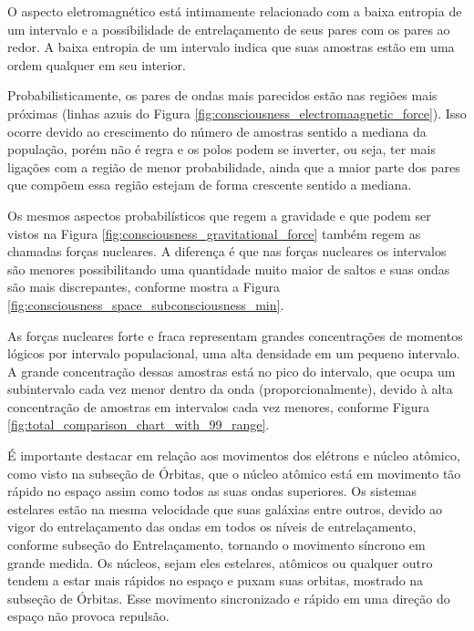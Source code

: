O aspecto eletromagnético está intimamente relacionado com a baixa entropia de um intervalo e a possibilidade de entrelaçamento de seus pares com os pares ao redor. A baixa entropia de um intervalo indica que suas amostras estão em uma ordem qualquer em seu interior.

Probabilisticamente, os pares de ondas mais parecidos estão nas regiões mais próximas (linhas azuis do Figura \ref{fig:consciousness_electromaagnetic_force}). Isso ocorre devido ao crescimento do número de amostras sentido a mediana da população, porém não é regra e os polos podem se inverter, ou seja, ter mais ligações com a região de menor probabilidade, ainda que a maior parte dos pares que compõem essa região estejam de forma crescente sentido a mediana.

Os mesmos aspectos probabilísticos que regem a gravidade e que podem ser vistos na Figura \ref{fig:consciousness_gravitational_force} também regem as chamadas forças nucleares. A diferença é que nas forças nucleares os intervalos são menores possibilitando uma quantidade muito maior de saltos e suas ondas são mais discrepantes, conforme mostra a Figura \ref{fig:consciousness_space_subconsciousness_min}.

As forças nucleares forte e fraca representam grandes concentrações de momentos lógicos por intervalo populacional, uma alta densidade em um pequeno intervalo. A grande concentração dessas amostras está no pico do intervalo, que ocupa um subintervalo cada vez menor dentro da onda (proporcionalmente), devido à alta concentração de amostras em intervalos cada vez menores, conforme Figura \ref{fig:total_comparison_chart_with_99_range}.

É importante destacar em relação aos movimentos dos elétrons e núcleo atômico, como visto na subseção de Órbitas, que o núcleo atômico está em movimento tão rápido no espaço assim como todos as suas ondas superiores. Os sistemas estelares estão na mesma velocidade que suas galáxias entre outros, devido ao vigor do entrelaçamento das ondas em todos os níveis de entrelaçamento, conforme subseção do Entrelaçamento, tornando o movimento síncrono em grande medida. Os núcleos, sejam eles estelares, atômicos ou qualquer outro tendem a estar mais rápidos no espaço e puxam suas orbitas, mostrado na subseção de Órbitas. Esse movimento sincronizado e rápido em uma direção do espaço não provoca repulsão.

